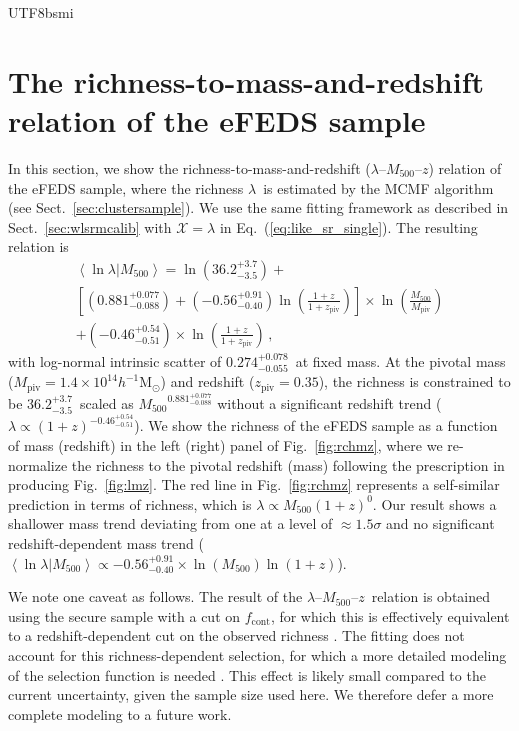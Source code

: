 \documentclass[longauth]{aa}
\newcommand{\Msunh}{\ensuremath{h^{-1}\mathrm{M}_{\odot}}}
\newcommand{\Mfiveoo}{\ensuremath{M_{500}}}
\newcommand{\redshift}{\ensuremath{z}}
\newcommand{\fcont}{\ensuremath{f_{\mathrm{cont}}}}
\newcommand{\rich}{\ensuremath{\lambda}}
\newcommand{\MPIV}{\ensuremath{M_{\mathrm{piv}}}}
\newcommand{\ZPIV}{\ensuremath{z_{\mathrm{piv}}}}
\newcommand{\Xlabel}{\ensuremath{\mathcal{X}}}
\newcommand{\ansArch}{\ensuremath{ 36.2^{+3.7}_{-3.5} }}
\newcommand{\ansBrch}{\ensuremath{ 0.881^{+0.077}_{-0.088} }}
\newcommand{\ansdeltarch}{\ensuremath{ -0.56^{+0.91}_{-0.40} }}
\newcommand{\ansgammarch}{\ensuremath{ -0.46^{+0.54}_{-0.51} }}
\newcommand{\anssigmarch}{\ensuremath{ 0.274^{+0.078}_{-0.055} }}
\begin{document}
\begin{CJK*}{UTF8}{bsmi}



%
%

\appendix

\section{The richness-to-mass-and-redshift relation of the eFEDS sample}
\label{sec:richness}

In this section, we show the richness-to-mass-and-redshift (\rich--\Mfiveoo--\redshift) relation of the eFEDS sample, where the richness \rich\ is estimated by the MCMF algorithm (see Sect.~\ref{sec:clustersample}).
We use the same fitting framework as described in Sect.~\ref{sec:wlsrmcalib} with $\Xlabel = \rich$ in Eq.~(\ref{eq:like_sr_single}).
The resulting relation is 
%
\begin{multline}
\label{eq:rchm}
\left\langle\ln\rich|\Mfiveoo\right\rangle 
= \ln \left( \ansArch \right) + \\
\left[ \left( \ansBrch \right) + \left( \ansdeltarch \right) \ln\left(\frac{1 + \redshift}{1 + \ZPIV}\right) \right] \times
\ln\left(\frac{\Mfiveoo}{\MPIV}\right) \\
+ \left( \ansgammarch \right)
 \times \ln \left(\frac{1 + \redshift}{1 + \ZPIV}\right)
 \, ,
\end{multline}
%
with log-normal intrinsic scatter of \anssigmarch\ at fixed mass.
At the pivotal mass ($\MPIV = 1.4\times10^{14}\Msunh$) and redshift ($\ZPIV=0.35$), the richness is constrained to be \ansArch\ scaled as ${\Mfiveoo}^{\ansBrch}$ without a significant redshift trend ($\rich\propto (1 + \redshift)^{\ansgammarch}$).
We show the richness of the eFEDS sample as a function of mass (redshift) in the left (right) panel of Fig.~\ref{fig:rchmz}, where we re-normalize the richness to the pivotal redshift (mass) following the prescription in producing Fig.~\ref{fig:lmz}.
The red line in Fig.~\ref{fig:rchmz} represents a self-similar prediction in terms of richness, which is $\rich\propto\Mfiveoo(1+\redshift)^{0}$.
Our result shows a shallower mass trend deviating from one at a level of 
$\approx1.5\sigma$
and no significant redshift-dependent mass trend ($\left\langle\ln\rich|\Mfiveoo\right\rangle  \propto \ansdeltarch \times \ln\left( \Mfiveoo \right) \ln \left( 1 + \redshift \right)$).


We note one caveat as follows. 
The result of the \rich--\Mfiveoo--\redshift\ relation is obtained using the secure sample with a cut on \fcont, for which this is effectively equivalent to a redshift-dependent cut on the observed richness \citep{klein18,klein19}.
The fitting does not account for this richness-dependent selection, for which a more detailed modeling of the selection function is needed \citep[as in][]{grandis20}.
This effect is likely small compared to the current uncertainty, given the sample size used here.
We therefore defer a more complete modeling to a future work.



\end{CJK*}
\end{document}
